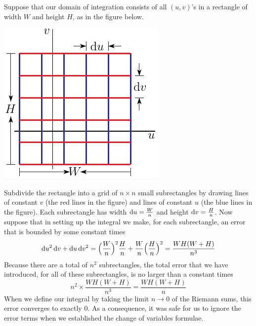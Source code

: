 Suppose that our domain of integration consists of all $(u,v)$'s 
in a rectangle of width $W$ and height $H$, as in the figure below.
\begin{nfig}
\begin{center}
    \includegraphics{slicing.pdf}
\end{center}
\end{nfig}
Subdivide the rectangle into a grid of $n\times n$ small subrectangles 
by drawing lines of constant $v$ (the red lines in the figure) and 
lines of constant $u$ (the blue lines in the figure).
Each subrectangle has width $\mathrm{d}u = \frac{W}{n}$ and height
$\mathrm{d}v = \frac{H}{n}$. Now suppose that in setting up the integral 
we make, for each subrectangle, an error that is bounded by some constant
times
\begin{equation*}
\mathrm{d}u^2\,\mathrm{d}v+\mathrm{d}u\,\mathrm{d}v^2
=\Big(\frac{W}{n}\Big)^2 \frac{H}{n}
 +  \frac{W}{n}\Big(\frac{H}{n}\Big)^2
=\frac{WH(W+H)}{n^3}
\end{equation*}
Because there are a total of $n^2$ subrectangles, the total error that 
we have introduced, for all of these subrectangles, is no larger than 
a constant times
\begin{equation*}
n^2 \times \frac{WH(W+H)}{n^3} = \frac{WH(W+H)}{n}
\end{equation*}
When we define our integral by taking the limit $n\rightarrow 0$ of 
the Riemann sums, this error converges to exactly $0$. As a consequence,
it was safe for us to ignore the error terms when we established the change
of variables formulae.






